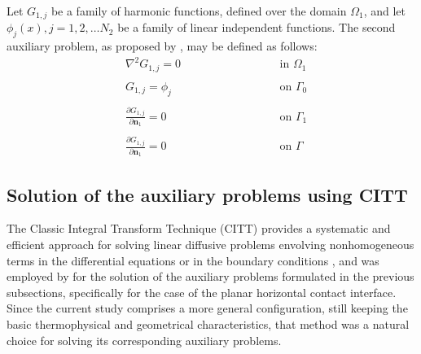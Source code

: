 \documentclass[12pt]{CHT-20}
\begin{document}
Let $G_{1,j}$ be a family of harmonic functions, defined over the domain $\Omega_1$, and let $\phi_j(x), j=1,2,\ldots N_2$ be a family of linear independent functions. The second auxiliary problem, as proposed by \cite{artigo_abreu_3}, may be defined as follows:
\begin{subequations}
	\begin{alignat}{2}
	& \nabla^2 G_{1,j} = 0 \quad\quad\quad\quad\quad && \text{ in } \Omega_1 \label{funcao_G_harm_T1} \\  \nonumber \\
	& G_{1,j} = \phi_j && \text{ on } \Gamma_0  \label{funcao_G_cc_T1_2} \\ \nonumber \\
	& \frac{\partial G_{1,j}}{\partial \mathbf{n}_1} = 0 && \text{ on }  \Gamma_1 \label{funcao_G_cc_T1_1} \\  \nonumber \\
	& \frac{\partial G_{1,j}}{\partial\mathbf{n}_1} = 0 \quad\quad\quad\quad\quad\quad\quad\quad && \text{ on }  \Gamma \label{funcao_G_cc_grad_T1}
	\end{alignat}
\end{subequations}

\subsection*{Solution of the auxiliary problems using CITT}
The Classic Integral Transform Technique (CITT) provides a systematic and efficient approach for solving linear diffusive problems envolving nonhomogeneous terms in the differential equations or in the boundary conditions \citep{livro_integral_transforms_cotta}, and was employed by \cite{artigo_padilha_3} for the solution of the auxiliary problems formulated in the previous subsections, specifically for the case of the planar horizontal contact interface. Since the current study comprises a more general configuration, still keeping the basic thermophysical and geometrical characteristics, that method was a natural choice for solving its corresponding auxiliary problems.
\end{document}
